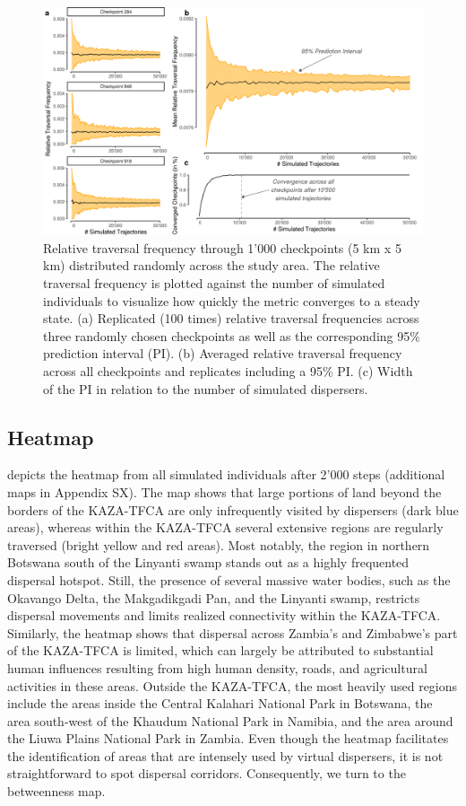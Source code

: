 \documentclass[abstract=on,10pt,a4paper,bibliography=totocnumbered]{article}
\begin{document}
\begin{figure}
  \begin{center}
    \includegraphics[width=\textwidth]{99_Convergence}
    \caption{Relative traversal frequency through 1'000 checkpoints (5 km x 5
    km) distributed randomly across the study area. The relative traversal
    frequency is plotted against the number of simulated individuals to
    visualize how quickly the metric converges to a steady state. (a) Replicated
    (100 times) relative traversal frequencies across three randomly chosen
    checkpoints as well as the corresponding 95\% prediction interval (PI). (b)
    Averaged relative traversal frequency across all checkpoints and replicates
    including a 95\% PI. (c) Width of the PI in relation to the number of
    simulated dispersers.}
    \label{Convergence}
  \end{center}
\end{figure}

\subsection{Heatmap}
 depicts the heatmap from all simulated individuals after 2'000
steps (additional maps in Appendix SX). The map shows that large portions of
land beyond the borders of the KAZA-TFCA are only infrequently visited by
dispersers (dark blue areas), whereas within the KAZA-TFCA several extensive
regions are regularly traversed (bright yellow and red areas). Most notably, the
region in northern Botswana south of the Linyanti swamp stands out as a highly
frequented dispersal hotspot. Still, the presence of several massive water
bodies, such as the Okavango Delta, the Makgadikgadi Pan, and the Linyanti
swamp, restricts dispersal movements and limits realized connectivity within the
KAZA-TFCA. Similarly, the heatmap shows that dispersal across Zambia's and
Zimbabwe's part of the KAZA-TFCA is limited, which can largely be attributed to
substantial human influences resulting from high human density, roads, and
agricultural activities in these areas. Outside the KAZA-TFCA, the most heavily
used regions include the areas inside the Central Kalahari National Park in
Botswana, the area south-west of the Khaudum National Park in Namibia, and the
area around the Liuwa Plains National Park in Zambia. Even though the heatmap
facilitates the identification of areas that are intensely used by virtual
dispersers, it is not straightforward to spot dispersal corridors.
Consequently, we turn to the betweenness map.
\end{document}
